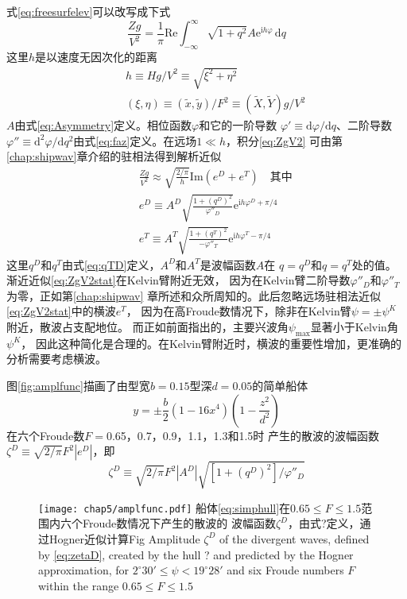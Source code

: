 式\eqref{eq:freesurfelev}可以改写成下式
\begin{equation}
  \frac{Zg}{V^2}=\frac{1}{\pi}\mathrm{Re}\int_{-\infty}^{\infty}
  \sqrt{1+q^2}A\mathrm{e}^{\mathrm{i}h\varphi}\,\mathrm{d}q
  \label{eq:ZgV2}
\end{equation}
这里$h$是以速度无因次化的距离
\begin{eqnarray}
  && h\equiv Hg/V^2\equiv \sqrt{\xi^2+\eta^2}\label{eq:h}\\
  && (\xi,\eta)\equiv (\tilde{x},\tilde{y})/F^2\equiv(\tilde{X},\tilde{Y})g/V^2
  \label{eq:xieta}
\end{eqnarray}
$A$由式\eqref{eq:Asymmetry}定义。相位函数$\varphi$和它的一阶导数
$\varphi'\equiv\mathrm{d}\varphi/\mathrm{d}q$、二阶导数$\varphi''\equiv\mathrm{d}^2\varphi/\mathrm{d}q^2$由式\eqref{eq:faz}定义。在远场$1\ll h$，积分\eqref{eq:ZgV2}
可由第\ref{chap:shipwav}章介绍的驻相法得到解析近似
\begin{eqnarray}
  &&\frac{Zg}{V^2}\approx\sqrt{\frac{2/\pi}{h}}\mathrm{Im}(e^D+e^T)\quad\text{其中}
  \label{eq:ZgV2stat}\\
  &&e^D\equiv A^D\sqrt{\frac{1+(q^D)^2}{\varphi''_D}}\mathrm{e}^{\mathrm{i}h\varphi^D+\pi/4}\label{eq:eD}\\
  &&e^T\equiv A^T\sqrt{\frac{1+(q^T)^2}{-\varphi''_T}}\mathrm{e}^{\mathrm{i}h\varphi^T-\pi/4}\label{eq:eT}
\end{eqnarray}
这里$q^D$和$q^T$由式\eqref{eq:qTD}定义，$A^D$和$A^T$是波幅函数$A$在
$q=q^D$和$q=q^T$处的值。渐近近似\eqref{eq:ZgV2stat}在Kelvin臂附近无效，
因为在Kelvin臂二阶导数$\varphi''_D$和$\varphi''_T$为零，正如第\ref{chap:shipwav}
章所述和众所周知的。此后忽略远场驻相法近似\eqref{eq:ZgV2stat}中的横波$e^T$，
因为在高Froude数情况下，除非在Kelvin臂$\psi=\pm\psi^K$附近，散波占支配地位。
而正如前面指出的，主要兴波角$\psi_{\max}$显著小于Kelvin角$\psi^K$，
因此这种简化是合理的。在Kelvin臂附近时，横波的重要性增加，更准确的分析需要考虑横波。

图\ref{fig:amplfunc}描画了由型宽$b=0.15$型深$d=0.05$的简单船体
\begin{equation}
  y=\pm\frac{b}{2}(1-16x^4)\left(1-\frac{z^2}{d^2}\right)
  \label{eq:simphull}
\end{equation}
在六个Froude数$F=$0.65，0.7，0.9，1.1，1.3和1.5时
产生的散波的波幅函数$\zeta^D\equiv\sqrt{2/\pi}F^2|e^D|$，即
\begin{equation}
  \zeta^D\equiv\sqrt{2/\pi}F^2|A^D|\sqrt{[1+(q^D)^2]/\varphi''_D}
  \label{eq:zetaD}
\end{equation}
%
\begin{figure}[htp]
  \centering
  \captionstyle{\centering}
  \texttt{[image: chap5/amplfunc.pdf]}
  {船体\eqref{eq:simphull}在$0.65\le F\le 1.5$范围内六个Froude数情况下产生的散波的
  波幅函数$\zeta^D$，由式?定义，通过Hogner近似计算}{Fig}
  {Amplitude $\zeta^D$ of the divergent waves, defined by \eqref{eq:zetaD}, 
  created by the hull ? and predicted by the Hogner approximation, 
  for $2^\circ30'\le\psi<19^\circ28'$ and six Froude numbers $F$ within the range 
$0.65 \le F \le 1.5$}
\end{figure}

